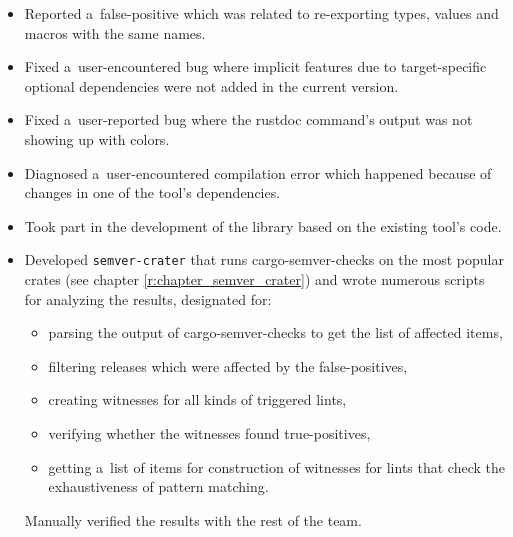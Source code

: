 \documentclass[licencjacka,en]{pracamgr}
\begin{document}
\begin{itemize}
\begin{itemize}
			\item Reported a~false-positive which was related to re-exporting types, values
				and macros with the same names.
			\item Fixed a~user-encountered bug where implicit features due to target-specific
				optional dependencies were not added in the current version.
			\item Fixed a~user-reported bug where the rustdoc command's output was not showing up
				with colors.
			\item Diagnosed a~user-encountered compilation error which happened because of changes
				in one of the tool's dependencies.
			\item Took part in the development of the library based on the existing tool's code.
			\item Developed \texttt{semver-crater} that runs cargo-semver-checks on the most popular crates
				(see chapter \ref{r:chapter_semver_crater})
				and wrote numerous scripts for analyzing the results, designated for:
				\begin{itemize}
					\item parsing the output of cargo-semver-checks to get the list of affected items,
					\item filtering releases which were affected by the  false-positives,
					\item creating witnesses for all kinds of triggered lints,
					\item verifying whether the witnesses found true-positives,
					\item getting a~list of items for construction of witnesses
						for lints that check the exhaustiveness of pattern matching.
				\end{itemize}
				Manually verified the results with the rest of the team.
		\end{itemize}


\end{itemize}
\end{document}
